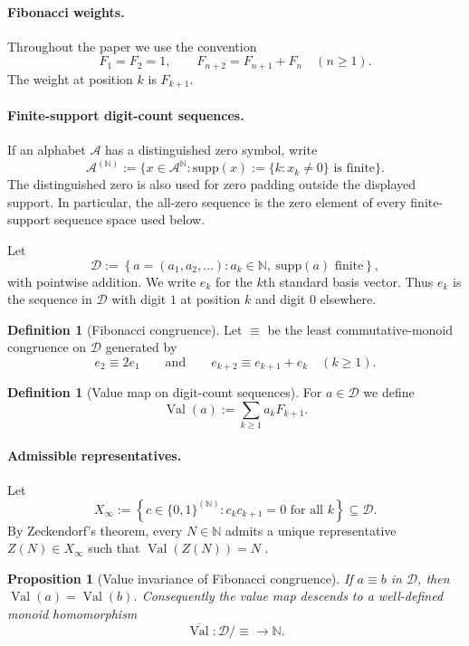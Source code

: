 \documentclass[11pt,letterpaper]{article}
\numberwithin{equation}{section}
\theoremstyle{plain}
\newtheorem{proposition}[theorem]{Proposition}
\theoremstyle{definition}
\newtheorem{definition}[theorem]{Definition}
\theoremstyle{remark}
\newcommand{\D}{\mathcal{D}}
\newcommand{\NN}{\mathbb{N}}
\newcommand{\Xinf}{X_\infty}
\newcommand{\supp}{\mathrm{supp}}
\newcommand{\leanverified}[1]{}
\DeclareMathOperator{\Val}{Val}
\begin{document}
\paragraph{Fibonacci weights.}
Throughout the paper we use the convention
\[
F_1=F_2=1,\qquad F_{n+2}=F_{n+1}+F_n\quad (n\ge 1).
\]
The weight at position $k$ is $F_{k+1}$.

\paragraph{Finite-support digit-count sequences.}
If an alphabet $\mathcal A$ has a distinguished zero symbol, write
\[
\mathcal A^{(\NN)}
:=
\{x\in\mathcal A^{\NN}:\supp(x):=\{k:x_k\ne0\}\text{ is finite}\}.
\]
The distinguished zero is also used for zero padding outside the displayed
support.  In particular, the all-zero sequence is the zero element of every
finite-support sequence space used below.

Let
\[
\D
:=
\left\{
a=(a_1,a_2,\ldots) : a_k\in\NN,\ \supp(a)\text{ finite}
\right\},
\]
with pointwise addition.  We write $e_k$ for the $k$th standard basis vector.
Thus $e_k$ is the sequence in $\D$ with digit $1$ at position $k$ and digit
$0$ elsewhere.

\begin{definition}[Fibonacci congruence]\label{def:fib-congruence}
Let $\equiv$ be the least commutative-monoid congruence on $\D$ generated by
\[
e_2\equiv 2e_1
\qquad\text{and}\qquad
e_{k+2}\equiv e_{k+1}+e_k \quad (k\ge 1).
\]
\end{definition}

\begin{definition}[Value map on digit-count sequences]\label{def:val-on-D}
For $a\in\D$ we define
\[
\Val(a):=\sum_{k\ge 1} a_k F_{k+1}.
\]
\end{definition}

\paragraph{Admissible representatives.}
Let
\[
\Xinf
:=
\left\{
c\in\{0,1\}^{(\NN)} : c_kc_{k+1}=0\text{ for all }k
\right\}
\subseteq\D.
\]
By Zeckendorf's theorem, every $N\in\NN$ admits a unique representative
$Z(N)\in \Xinf$ such that $\Val(Z(N))=N$ \cite{Zeckendorf1972}.

\begin{proposition}[Value invariance of Fibonacci congruence]\label{prop:val-invariant}
If $a\equiv b$ in $\D$, then $\Val(a)=\Val(b)$.  Consequently the value map
descends to a well-defined monoid homomorphism
\[
\overline{\Val}:\D/\!\equiv \to \NN.
\]
\leanverified{paper_zeckendorf_val_invariant_seeds}
\end{proposition}
\end{document}
